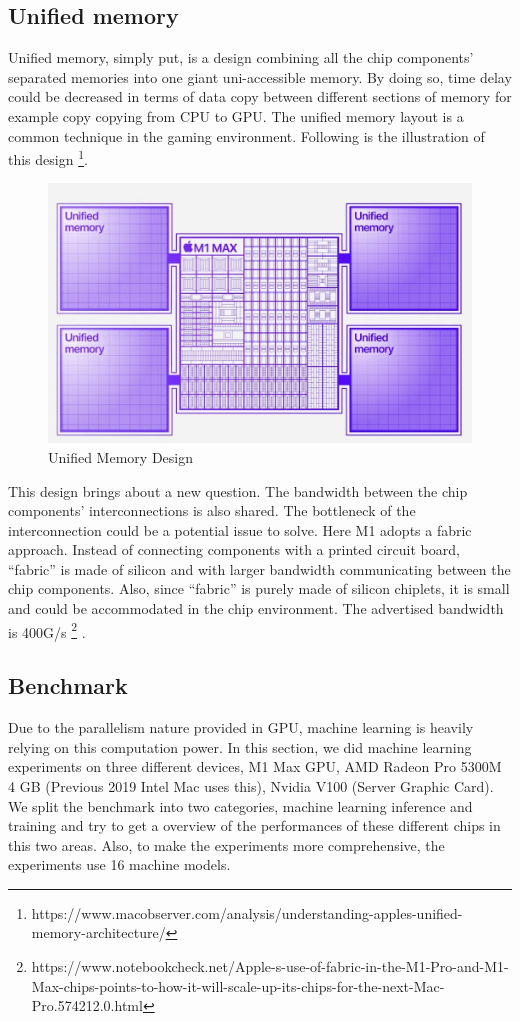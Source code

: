 \documentclass[11pt]{article}
\begin{document}
\subsection*{Unified memory}
Unified memory, simply put, is a design combining all the chip components’ separated memories into one giant uni-accessible memory. By doing so, time delay could be decreased in terms of data copy between different sections of memory for example copy copying from CPU to GPU. The unified memory layout is a common technique in the gaming environment. Following is the illustration of this design \footnote{https://www.macobserver.com/analysis/understanding-apples-unified-memory-architecture/}.

\begin{figure}[h]
    \centering
    \includegraphics[scale = 0.2]{unified_memory.jpg}
    \caption{Unified Memory Design}
    
	\label{fig:Unified Memory Design}
\end{figure}

This design brings about a new question. The bandwidth between the chip components’ interconnections is also shared. The bottleneck of the interconnection could be a potential issue to solve. Here M1 adopts a fabric approach. Instead of connecting components with a printed circuit board, “fabric” is made of silicon and with larger bandwidth communicating between the chip components. Also, since “fabric” is purely made of silicon chiplets, it is small and could be accommodated in the chip environment. The advertised bandwidth is 400G/s \footnote{https://www.notebookcheck.net/Apple-s-use-of-fabric-in-the-M1-Pro-and-M1-Max-chips-points-to-how-it-will-scale-up-its-chips-for-the-next-Mac-Pro.574212.0.html}
.

\subsection*{Benchmark}
Due to the parallelism nature provided in GPU, machine learning is heavily relying on this computation power. In this section, we did machine learning experiments on three different devices, M1 Max GPU, AMD Radeon Pro 5300M 4 GB (Previous 2019 Intel Mac uses this), Nvidia V100 (Server Graphic Card). We split the benchmark into two categories, machine learning inference and training and try to get a overview of the performances of these different chips in this two areas. Also, to make the experiments more comprehensive, the experiments use 16 machine models.
\end{document}
